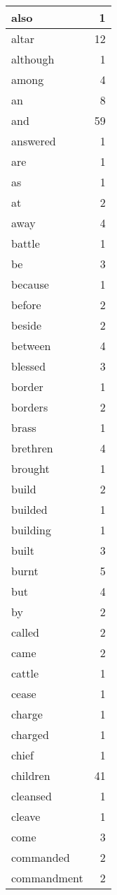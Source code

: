 \begin{center}
\begin{longtable}{l|r}
also & 1\\ \hline 
altar & 12\\ \hline 
although & 1\\ \hline 
among & 4\\ \hline 
an & 8\\ \hline 
and & 59\\ \hline 
answered & 1\\ \hline 
are & 1\\ \hline 
as & 1\\ \hline 
at & 2\\ \hline 
away & 4\\ \hline 
battle & 1\\ \hline 
be & 3\\ \hline 
because & 1\\ \hline 
before & 2\\ \hline 
beside & 2\\ \hline 
between & 4\\ \hline 
blessed & 3\\ \hline 
border & 1\\ \hline 
borders & 2\\ \hline 
brass & 1\\ \hline 
brethren & 4\\ \hline 
brought & 1\\ \hline 
build & 2\\ \hline 
builded & 1\\ \hline 
building & 1\\ \hline 
built & 3\\ \hline 
burnt & 5\\ \hline 
but & 4\\ \hline 
by & 2\\ \hline 
called & 2\\ \hline 
came & 2\\ \hline 
cattle & 1\\ \hline 
cease & 1\\ \hline 
charge & 1\\ \hline 
charged & 1\\ \hline 
chief & 1\\ \hline 
children & 41\\ \hline 
cleansed & 1\\ \hline 
cleave & 1\\ \hline 
come & 3\\ \hline 
commanded & 2\\ \hline 
commandment & 2\\ \hline 

\end{longtable}
\end{center}
